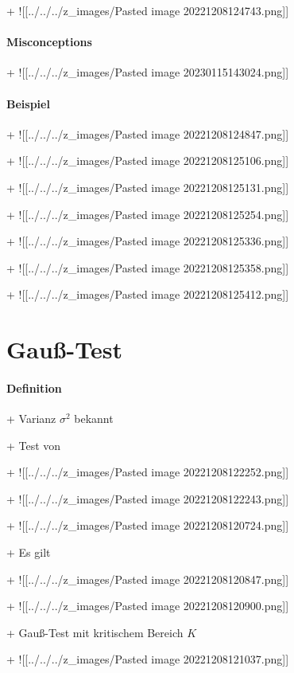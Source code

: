 \documentclass[10pt]{report}
\begin{document}
+ ![[../../../z\_images/Pasted image 20221208124743.png]]


\subsubsection{Misconceptions}

+ ![[../../../z\_images/Pasted image 20230115143024.png]]


\subsubsection{Beispiel}

+ ![[../../../z\_images/Pasted image 20221208124847.png]]

+ ![[../../../z\_images/Pasted image 20221208125106.png]]

+ ![[../../../z\_images/Pasted image 20221208125131.png]]

+ ![[../../../z\_images/Pasted image 20221208125254.png]]

+ ![[../../../z\_images/Pasted image 20221208125336.png]]

+ ![[../../../z\_images/Pasted image 20221208125358.png]]

+ ![[../../../z\_images/Pasted image 20221208125412.png]]
\chapter{Gauß-Test}\label{ch:Gauß-Test}

\subsubsection{Definition}

+ Varianz $\sigma^2$ bekannt

+ Test von

+ ![[../../../z\_images/Pasted image 20221208122252.png]]

+ ![[../../../z\_images/Pasted image 20221208122243.png]]

+ ![[../../../z\_images/Pasted image 20221208120724.png]]

+ Es gilt

+ ![[../../../z\_images/Pasted image 20221208120847.png]]

+ ![[../../../z\_images/Pasted image 20221208120900.png]]

+ Gauß-Test mit kritischem Bereich $K$

+ ![[../../../z\_images/Pasted image 20221208121037.png]]
\end{document}

